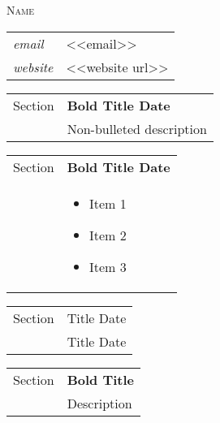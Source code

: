 \documentclass[letterpaper,10pt,oneside]{article}
\begin{document}
{\LARGE\hspace{1.05in}\textsc{Name}}
\vspace{1em}

\normalsize
\hspace{0.6in}
\noindent \begin{tabular}{l l}
 \hspace{0.3in}\emph{email} & \hspace{0.25in} {<<email>>}\\
 \hspace{0.3in}\emph{website} & \hspace{0.25in} {<<website url>>}\\
\end{tabular}

\vspace{1em}

\noindent \begin{tabular}{p{1in} p{6.25in}}
    \normalsize{\sc Section} & \textbf{Bold Title \hfill Date}\\
    & Non-bulleted description\\
\end{tabular}

\noindent \begin{longtable}{p{1in} p{6.25in}}
    \normalsize{\sc Section} & \textbf{Bold Title \hfill Date}\\
    & \vspace{-1\baselineskip}
        \begin{itemize}[noitemsep,topsep=0pt]
            \item Item 1
            \item Item 2
            \item Item 3
        \end{itemize}\\
\end{longtable}

\vspace{-2\baselineskip}
\begin{longtable}{p{1in} p{6.25in}}
    \normalsize{\sc Section} & Title \hfill Date \\
    & Title \hfill Date \\
\end{longtable}
\vspace{-1\baselineskip}
\begin{longtable}{p{1in} p{6.25in}}
    \normalsize{\sc Section} & \textbf{Bold Title} \\
    & Description\\
\end{longtable}
\end{document}
